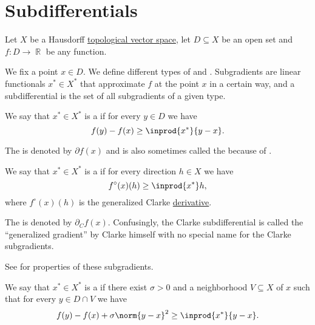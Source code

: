 \section{Subdifferentials}\label{sec:subdifferentials}

Let \( X \) be a Hausdorff \hyperref[def:topological_vector_space]{topological vector space}, let \( D \subseteq X \) be an open set and \( f: D \to \BbbR \) be any function.

\begin{definition}\label{def:subdifferentials}
  We fix a point \( x \in D \). We define different types of  and . Subgradients are linear functionals \( x^* \in X^* \) that approximate \( f \) at the point \( x \) in a certain way, and a subdifferential is the set of all subgradients of a given type.

  \begin{thmenum}
    We say that \( x^* \in X^* \) is a  if for every \( y \in D \) we have
    \begin{equation*}
      f(y) - f(x) \geq \inprod {x^*} {y - x}.
    \end{equation*}

    The  is denoted by \( \partial f(x) \) and is also sometimes called the  because of .

    We say that \( x^* \in X^* \) is a  if for every direction \( h \in X \) we have
    \begin{equation*}
      f^\circ(x)(h) \geq \inprod {x^*} h,
    \end{equation*}
    where \( f^\circ(x)(h) \) is the generalized Clarke \hyperref[def:nonsmooth_derivatives/clarke]{derivative}.

    The  is denoted by \( \partial_C f(x) \). Confusingly, the Clarke subdifferential is called the \enquote{generalized gradient} by Clarke himself with no special name for the Clarke subgradients.

    See  for properties of these subgradients.

    We say that \( x^* \in X^* \) is a  if there exist \( \sigma > 0 \) and a neighborhood \( V \subseteq X \) of \( x \) such that for every \( y \in D \cap V \) we have
    \begin{equation*}
      f(y) - f(x) + \sigma \norm{y - x}^2 \geq \inprod {x^*} {y - x}.
    \end{equation*}


\end{thmenum}
\end{definition}
